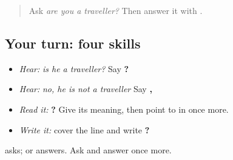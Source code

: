 \label{lesson:PA-C214-payoff}



\begin{quote}
Ask \emph{are you a traveller?} Then answer it with \textbf{ }.
\end{quote}

\subsection*{Your turn: four skills}
\begin{itemize}
\raggedright
  \item \emph{Hear:} \emph{is he a traveller?} Say \textbf{   ?}
  \item \emph{Hear:} \emph{no, he is not a traveller} Say \textbf{ ,    }
  \item \emph{Read it:} \textbf{   ?} Give its meaning, then point to \textbf{} in \textbf{} once more.
  \item \emph{Write it:} cover the line and write \textbf{   ?}
\end{itemize}

\begin{tcolorbox}[breakable,colback=teal!4,colframe=teal!35!black,title={Before you move on}]
\textbf{} asks; \textbf{ } or \textbf{ } answers. Ask and answer once more.
\end{tcolorbox}

